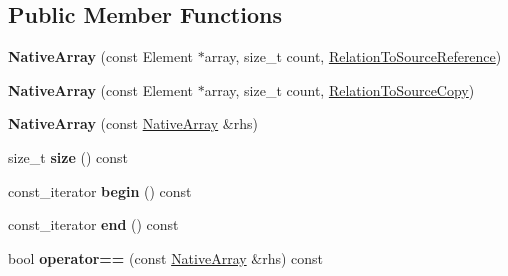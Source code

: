 \subsection*{Public Member Functions}
\begin{DoxyCompactItemize}
\item 
\mbox{\label{classtesting_1_1internal_1_1_native_array_a52b3689c62532703d11e9d82939a7141}} 
{\bfseries Native\+Array} (const Element $\ast$array, size\+\_\+t count, \mbox{\hyperlink{structtesting_1_1internal_1_1_relation_to_source_reference}{Relation\+To\+Source\+Reference}})
\item 
\mbox{\label{classtesting_1_1internal_1_1_native_array_ac184ee5741af5be3402213819c834405}} 
{\bfseries Native\+Array} (const Element $\ast$array, size\+\_\+t count, \mbox{\hyperlink{structtesting_1_1internal_1_1_relation_to_source_copy}{Relation\+To\+Source\+Copy}})
\item 
\mbox{\label{classtesting_1_1internal_1_1_native_array_abb346ac3040f5da733f594cc2d5958bc}} 
{\bfseries Native\+Array} (const \mbox{\hyperlink{classtesting_1_1internal_1_1_native_array}{Native\+Array}} \&rhs)
\item 
\mbox{\label{classtesting_1_1internal_1_1_native_array_af96a4a5ca0cdd5d163c47a081f08bd89}} 
size\+\_\+t {\bfseries size} () const
\item 
\mbox{\label{classtesting_1_1internal_1_1_native_array_a3046d93cfa23097e7b7c91f5f982dc78}} 
const\+\_\+iterator {\bfseries begin} () const
\item 
\mbox{\label{classtesting_1_1internal_1_1_native_array_ae1cda748e49c6906421c6183c4d07c5a}} 
const\+\_\+iterator {\bfseries end} () const
\item 
\mbox{\label{classtesting_1_1internal_1_1_native_array_a81b90f5739ed812610e68dc34c9e3850}} 
bool {\bfseries operator==} (const \mbox{\hyperlink{classtesting_1_1internal_1_1_native_array}{Native\+Array}} \&rhs) const
\end{DoxyCompactItemize}
